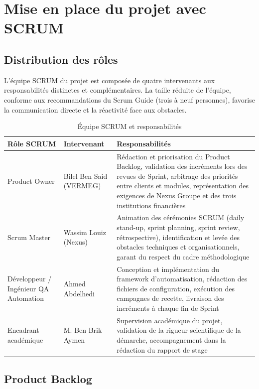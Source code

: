 \documentclass[12pt, a4paper]{report}
\begin{document}
\section{Mise en place du projet avec SCRUM}

\subsection{Distribution des rôles}

L'équipe SCRUM du projet est composée de quatre intervenants aux responsabilités distinctes et complémentaires. La taille réduite de l'équipe, conforme aux recommandations du Scrum Guide (trois à neuf personnes), favorise la communication directe et la réactivité face aux obstacles.

\begin{table}[H]
\centering
\caption{Équipe SCRUM et responsabilités}
\label{tab:roles}
\begin{tabularx}{\textwidth}{p{2.6cm}p{3.0cm}X}
\toprule
\textbf{Rôle SCRUM} & \textbf{Intervenant} & \textbf{Responsabilités} \\
\midrule
Product Owner
  & Bilel Ben Said (VERMEG)
  & Rédaction et priorisation du Product Backlog, validation des incréments lors des revues de Sprint, arbitrage des priorités entre clients et modules, représentation des exigences de Nexus Groupe et des trois institutions financières \\[6pt]
Scrum Master
  & Wassim Louiz (Nexus)
  & Animation des cérémonies SCRUM (daily stand-up, sprint planning, sprint review, rétrospective), identification et levée des obstacles techniques et organisationnels, garant du respect du cadre méthodologique \\[6pt]
Développeur / Ingénieur QA Automation
  & Ahmed Abdelhedi
  & Conception et implémentation du framework d'automatisation, rédaction des fichiers de configuration, exécution des campagnes de recette, livraison des incréments à chaque fin de Sprint \\[6pt]
Encadrant académique
  & M. Ben Brik Aymen
  & Supervision académique du projet, validation de la rigueur scientifique de la démarche, accompagnement dans la rédaction du rapport de stage \\
\bottomrule
\end{tabularx}
\end{table}

\subsection{Product Backlog}
\end{document}
